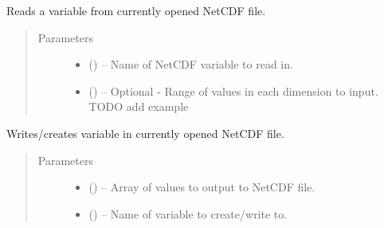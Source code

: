 \documentclass[a4paper,10pt,openany,english]{sphinxmanual}
\begin{document}
\begin{fulllineitems}
\begin{fulllineitems}
\begin{quote}
\begin{description}
\end{description}\end{quote}

\end{fulllineitems}


\begin{fulllineitems}
\label{egadsapi:egads.input.netcdf_io.NetCdf.read_variable}
Reads a variable from currently opened NetCDF file.
\begin{quote}\begin{description}
\item[{Parameters}] \leavevmode\begin{itemize}
\item {} 
 () -- Name of NetCDF variable to read in.

\item {} 
 () -- Optional - Range of values in each dimension to input. TODO add example

\end{itemize}

\end{description}\end{quote}

\end{fulllineitems}


\begin{fulllineitems}
\label{egadsapi:egads.input.netcdf_io.NetCdf.write_variable}
Writes/creates variable in currently opened NetCDF file.
\begin{quote}\begin{description}
\item[{Parameters}] \leavevmode\begin{itemize}
\item {} 
 () -- Array of values to output to NetCDF file.

\item {} 
 () -- Name of variable to create/write to.


\end{itemize}
\end{description}
\end{quote}
\end{fulllineitems}
\end{fulllineitems}
\end{document}
